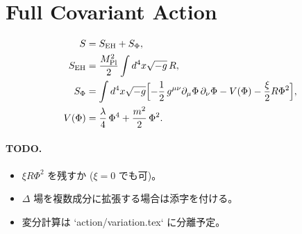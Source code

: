 \section{Full Covariant Action}\label{sec:action}

\newcommand{\Mpl}{M_{\mathrm{Pl}}}
\newcommand{\PhiField}{\Phi}

\begin{align}
S &= S_{\text{EH}} + S_{\Phi} ,                                         \\
S_{\text{EH}} &= \frac{\Mpl^{2}}{2}\int d^{4}x\sqrt{-g}\,R ,            \\
S_{\Phi} &= \int d^{4}x\sqrt{-g}\Bigl[
      -\frac12\,g^{\mu\nu}\partial_\mu\PhiField\,\partial_\nu\PhiField  %
      - V(\PhiField)                                                    %
      - \frac{\xi}{2} R\PhiField^{2}                                    %
    \Bigr] ,                                                            \\
V(\PhiField) &= \frac{\lambda}{4}\,\PhiField^{4} + \frac{m^{2}}{2}\,\PhiField^{2}.
\end{align}

\paragraph{TODO.}
\begin{itemize}
  \item $\xi R\Phi^{2}$ を残すか ($\xi=0$ でも可)。
  \item $\Delta$ 場を複数成分に拡張する場合は添字を付ける。
  \item 変分計算は `action/variation.tex` に分離予定。
\end{itemize}
